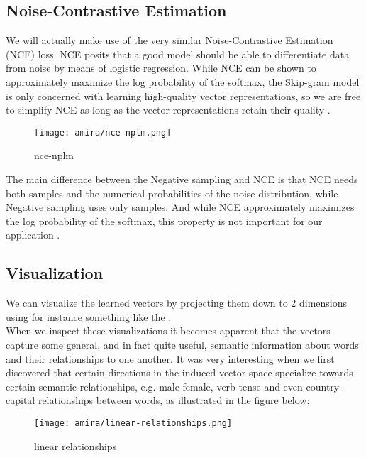 \subsection{Noise-Contrastive Estimation}

We will actually make use of the very similar Noise-Contrastive Estimation (NCE) loss. NCE posits that a good model should be able to differentiate data from noise by means of logistic regression. While NCE can be shown to approximately maximize the log probability of the softmax, the Skip-gram model is only concerned with learning high-quality vector representations, so we are free to simplify NCE as long as the vector representations retain their quality \cite{DBLP:journals/corr/MikolovSCCD13}.

\begin{figure}[H]%
    \center%
    \texttt{[image: amira/nce-nplm.png]}%
    \caption[nce]{nce-nplm}\label{fig:nce-nplm}%
\end{figure}

The main difference between the Negative sampling and NCE is that NCE needs both
samples and the numerical probabilities of the noise distribution, while Negative sampling uses only samples. And while NCE approximately maximizes the log probability of the softmax, this property is not important for our application \cite{DBLP:journals/corr/MikolovSCCD13}.

\subsection{Visualization}

 We can visualize the learned vectors by projecting them down to 2 dimensions using for instance something like the \textcite{t-SNE dimensionality reduction technique}.\\ When we inspect these visualizations it becomes apparent that the vectors capture some general, and in fact quite useful, semantic information about words and their relationships to one another. It was very interesting when we first discovered that certain directions in the induced vector space specialize towards certain semantic relationships, e.g. male-female, verb tense and even country-capital relationships between words, as illustrated in the figure below:
 
  \begin{figure}[H]%
      \center%
        \texttt{[image: amira/linear-relationships.png]}%
        \caption[linear]{linear relationships}\label{fig:nce-nplm}%
  \end{figure}
